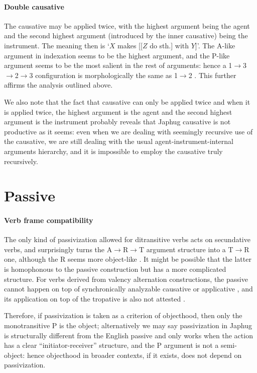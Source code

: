\documentclass[a4paper, oneside, 12pt]{report}
\newcommand*{\textto}{$\to$}
\newcommand*{\citesec}[1]{\S~{#1}}
\newcommand*{\citepage}[1]{p.~{#1}}
\newcommand{\translate}[1]{`#1'}
\begin{document}
\paragraph*{Double causative}
The causative may be applied twice,
with the highest argument being the agent
and the second highest argument (introduced by the inner causative) being the instrument.
The meaning then is \translate{$X$ makes [[$Z$ do sth.] with $Y$]}.
The A-like argument in indexation seems to be the highest argument,
and the P-like argument seems to be the most salient in the rest of arguments:
hence a 1\textto 3\textto 2\textto 3 configuration
is morphologically the same as 1\textto 2
\citep[\citepage{848}, (67)]{jacques2021grammar}.
This further affirms the analysis outlined above.

We also note that the fact that causative can only be applied twice and
when it is applied twice, the highest argument is the agent
and the second highest argument is the instrument
probably reveals that Japhug causative is not productive as it seems:
even when we are dealing with seemingly recursive use of the causative,
we are still dealing with the usual agent-instrument-internal arguments hierarchy,
and it is impossible to employ the causative truly recursively.

\section{Passive}

\paragraph*{Verb frame compatibility}\label{sec:voice.passive.input}
The only kind of passivization allowed for ditransitive verbs
acts on secundative verbs,
and surprisingly turns the A\textto R\textto T argument structure
into a T\textto R one, although the R seems more object-like
\citep[\citepage{884}]{jacques2021grammar}.
It might be possible that the latter is homophonous to the passive construction
but has a more complicated structure.
For verbs derived from valency alternation constructions,
the passive cannot happen on top of synchronically analyzable causative or applicative 
\citep[\citepage{885}]{jacques2021grammar},
and its application on top of the tropative is also not attested
\citep[\citesec{17.5.4}]{jacques2021grammar}.

Therefore, if passivization is taken as a criterion of objecthood,
then only the monotransitive P is the object;
alternatively we may say passivization in Japhug
is structurally different from the English passive
and only works when the action has a clear ``initiator-receiver'' structure,
and the P argument is not a semi-object:
hence objecthood in broader contexts, if it exists,
does not depend on passivization.
\end{document}
